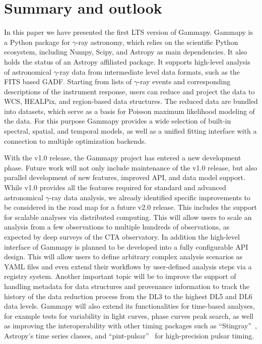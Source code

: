 \documentclass[longauth]{aa}
\newcommand{\gammapy}{Gammapy\xspace}
\newcommand{\gammaray}{$\gamma$-ray\xspace}
\newcommand{\gadf}{GADF\xspace}
\begin{document}
\section{Summary and outlook}
\label{sec:summary-and-outlook}
%
In this paper we have presented the first LTS version of \gammapy.
\gammapy is a Python package for \gammaray astronomy, which relies on the
scientific Python ecosystem, including Numpy, Scipy, and Astropy as
main dependencies. It also holds the status of an Astropy affiliated
package. It supports high-level analysis of astronomical \gammaray
data from intermediate level data formats, such as the FITS based
\gadf. Starting from lists of \gammaray events and corresponding descriptions
of the instrument response, users can reduce and project the data
to WCS, HEALPix, and region-based data structures. The reduced data are bundled
into datasets, which serve as a basis for Poisson maximum likelihood
modeling of the data. For this purpose \gammapy provides a wide selection
of built-in spectral, spatial, and temporal models, as well as a unified
fitting interface with a connection to multiple optimization backends.

With the v1.0 release, the \gammapy project has entered a new development
phase. Future work will not only include maintenance of the v1.0 release,
but also parallel development of new features, improved API, and data
model support. While v1.0 provides all the features required for
standard and advanced astronomical \gammaray data analysis,
we already identified specific improvements to be considered in the
road map for a future v2.0 release. This includes the support for
scalable analyses via distributed computing. This will allow
users to scale an analysis from a few observations to multiple
hundreds of observations, as expected by deep surveys of the CTA
observatory. In addition the high-level interface
of \gammapy is planned to be developed into a fully configurable
API design. This will allow users to define arbitrary complex analysis
scenarios as YAML files and even extend their workflows by user-defined
analysis steps via a registry system. Another important topic will
be to improve the support of handling metadata for data structures
and provenance information to track the history of the data reduction
process from the DL3 to the highest DL5 and DL6 data levels. \gammapy will
also extend its functionalities for time-based analyses,
for example tests for variability in light curves, phase curves peak search, 
as well as improving the interoperability with other timing packages such
as \enquote{Stingray}~\citep{Stingray2019}, Astropy's
time series classes, and \enquote{pint-pulsar}~\citep{Luo2021}
 for high-precision pulsar timing.
\end{document}
